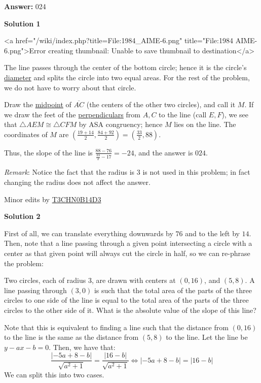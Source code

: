 \begin{enumerate}
 
 \textbf{Answer: }024



\textbf{Solution 1}

<a href="/wiki/index.php?title=File:1984\_AIME-6.png" title="File:1984 AIME-6.png">Error creating thumbnail: Unable to save thumbnail to destination</a>

 The line passes through the center of the bottom circle; hence it is the circle's \href{https://artofproblemsolving.com/wiki/index.php?title=Diameter}{diameter} and splits the circle into two equal areas. For the rest of the problem, we do not have to worry about that circle. 

 Draw the \href{https://artofproblemsolving.com/wiki/index.php?title=Midpoint}{midpoint} of $\overline{AC}$ (the centers of the other two circles), and call it $M$. If we draw the feet of the \href{https://artofproblemsolving.com/wiki/index.php?title=Perpendicular}{perpendiculars} from $A,C$ to the line (call $E,F$), we see that $\triangle AEM\cong \triangle CFM$ by ASA congruency; hence $M$ lies on the line. The coordinates of $M$ are $\left(\frac{19+14}{2},\frac{84+92}{2}\right) = \left(\frac{33}{2},88\right)$. 

 Thus, the slope of the line is $\frac{88 - 76}{\frac{33}{2} - 17} = -24$, and the answer is $\boxed{024}$.

 \textit{Remark}: Notice the fact that the radius is 3 is not used in this problem; in fact changing the radius does not affect the answer.

 Minor edits by \href{https://artofproblemsolving.com/wiki/index.php?title=User:T3chn0b14d3&action=edit&redlink=1}{T3CHN0B14D3}

 



\textbf{Solution 2}

First of all, we can translate everything downwards by $76$ and to the left by $14$. Then, note that a line passing through a given point intersecting a circle with a center as that given point will always cut the circle in half, so we can re-phrase the problem:

 Two circles, each of radius $3$, are drawn with centers at $(0, 16)$, and $(5, 8)$. A line passing through $(3,0)$ is such that the total area of the parts of the three circles to one side of the line is equal to the total area of the parts of the three circles to the other side of it. What is the absolute value of the slope of this line?

 Note that this is equivalent to finding a line such that the distance from $(0,16)$ to the line is the same as the distance from $(5,8)$ to the line. Let the line be $y - ax - b = 0$. Then, we have that:
 \[\frac{|-5a + 8 - b|}{\sqrt{a^2+1}}= \frac{|16 - b|}{\sqrt{a^2+1}} \Longleftrightarrow |-5a+8-b| = |16-b|\]We can split this into two cases.


\end{enumerate}
